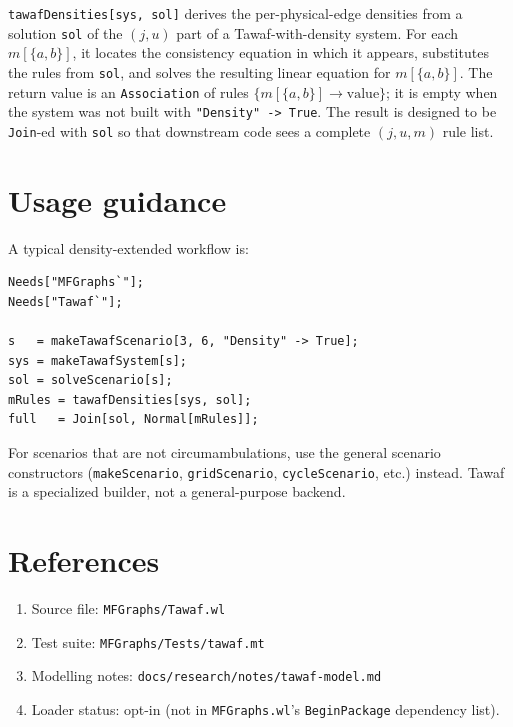 \documentclass[11pt]{article}
\begin{document}
\texttt{tawafDensities[sys, sol]} derives the per-physical-edge densities from a solution \texttt{sol} of the $(j, u)$ part of a Tawaf-with-density system. For each $m[\{a, b\}]$, it locates the consistency equation in which it appears, substitutes the rules from \texttt{sol}, and solves the resulting linear equation for $m[\{a, b\}]$. The return value is an \texttt{Association} of rules $\{m[\{a, b\}] \to \text{value}\}$; it is empty when the system was not built with \texttt{"Density" -> True}. The result is designed to be \texttt{Join}-ed with \texttt{sol} so that downstream code sees a complete $(j, u, m)$ rule list.

\section{Usage guidance}

A typical density-extended workflow is:

\begin{verbatim}
Needs["MFGraphs`"];
Needs["Tawaf`"];

s   = makeTawafScenario[3, 6, "Density" -> True];
sys = makeTawafSystem[s];
sol = solveScenario[s];
mRules = tawafDensities[sys, sol];
full   = Join[sol, Normal[mRules]];
\end{verbatim}

For scenarios that are not circumambulations, use the general scenario constructors (\texttt{makeScenario}, \texttt{gridScenario}, \texttt{cycleScenario}, etc.) instead. Tawaf is a specialized builder, not a general-purpose backend.

\section*{References}

\begin{enumerate}
\item Source file: \texttt{MFGraphs/Tawaf.wl}
\item Test suite: \texttt{MFGraphs/Tests/tawaf.mt}
\item Modelling notes: \texttt{docs/research/notes/tawaf-model.md}
\item Loader status: opt-in (not in \texttt{MFGraphs.wl}'s \texttt{BeginPackage} dependency list).
\end{enumerate}
\end{document}
